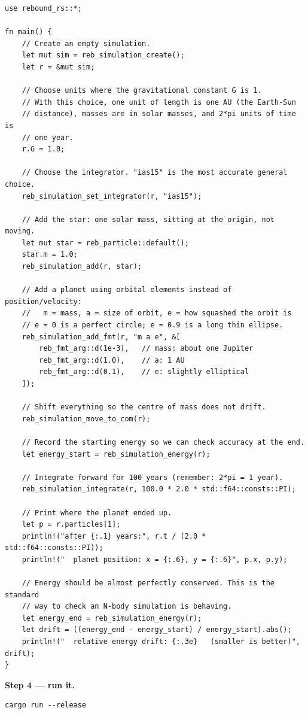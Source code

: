 \documentclass[11pt]{article}
\begin{document}
\begin{lstlisting}
use rebound_rs::*;

fn main() {
    // Create an empty simulation.
    let mut sim = reb_simulation_create();
    let r = &mut sim;

    // Choose units where the gravitational constant G is 1.
    // With this choice, one unit of length is one AU (the Earth-Sun
    // distance), masses are in solar masses, and 2*pi units of time is
    // one year.
    r.G = 1.0;

    // Choose the integrator. "ias15" is the most accurate general choice.
    reb_simulation_set_integrator(r, "ias15");

    // Add the star: one solar mass, sitting at the origin, not moving.
    let mut star = reb_particle::default();
    star.m = 1.0;
    reb_simulation_add(r, star);

    // Add a planet using orbital elements instead of position/velocity:
    //   m = mass, a = size of orbit, e = how squashed the orbit is
    // e = 0 is a perfect circle; e = 0.9 is a long thin ellipse.
    reb_simulation_add_fmt(r, "m a e", &[
        reb_fmt_arg::d(1e-3),   // mass: about one Jupiter
        reb_fmt_arg::d(1.0),    // a: 1 AU
        reb_fmt_arg::d(0.1),    // e: slightly elliptical
    ]);

    // Shift everything so the centre of mass does not drift.
    reb_simulation_move_to_com(r);

    // Record the starting energy so we can check accuracy at the end.
    let energy_start = reb_simulation_energy(r);

    // Integrate forward for 100 years (remember: 2*pi = 1 year).
    reb_simulation_integrate(r, 100.0 * 2.0 * std::f64::consts::PI);

    // Print where the planet ended up.
    let p = r.particles[1];
    println!("after {:.1} years:", r.t / (2.0 * std::f64::consts::PI));
    println!("  planet position: x = {:.6}, y = {:.6}", p.x, p.y);

    // Energy should be almost perfectly conserved. This is the standard
    // way to check an N-body simulation is behaving.
    let energy_end = reb_simulation_energy(r);
    let drift = ((energy_end - energy_start) / energy_start).abs();
    println!("  relative energy drift: {:.3e}   (smaller is better)", drift);
}
\end{lstlisting}

\textbf{Step 4 --- run it.}

\begin{lstlisting}
cargo run --release
\end{lstlisting}
\end{document}
